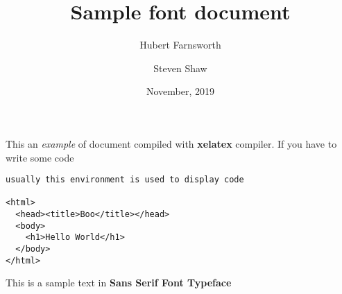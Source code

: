 \documentclass[14pt]{article}
\title{Sample font document}
\author{Hubert Farnsworth}
\author{Steven Shaw}
\date{November, 2019}
\begin{document}
  \maketitle

   This an \textit{example} of document compiled with
   \textbf{xelatex} compiler. If you have to write
   some code

   \begin{verbatim}
usually this environment is used to display code

<html>
  <head><title>Boo</title></head>
  <body>
    <h1>Hello World</h1>
  </body>
</html>
   \end{verbatim}

  {\sffamily This is a sample text in \textbf{Sans Serif Font Typeface}}
\end{document}

